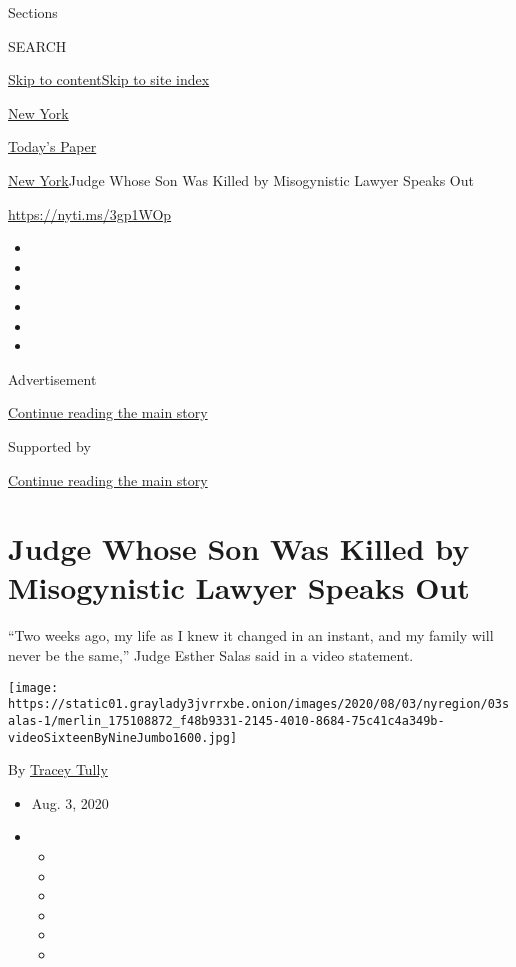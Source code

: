 Sections

SEARCH

\protect\hyperlink{site-content}{Skip to
content}\protect\hyperlink{site-index}{Skip to site index}

\href{https://www.nytimes3xbfgragh.onion/section/nyregion}{New York}

\href{https://myaccount.nytimes3xbfgragh.onion/auth/login?response_type=cookie\&client_id=vi}{}

\href{https://www.nytimes3xbfgragh.onion/section/todayspaper}{Today's
Paper}

\href{/section/nyregion}{New York}\textbar{}Judge Whose Son Was Killed
by Misogynistic Lawyer Speaks Out

\url{https://nyti.ms/3gp1WOp}

\begin{itemize}
\item
\item
\item
\item
\item
\item
\end{itemize}

Advertisement

\protect\hyperlink{after-top}{Continue reading the main story}

Supported by

\protect\hyperlink{after-sponsor}{Continue reading the main story}

\hypertarget{judge-whose-son-was-killed-by-misogynistic-lawyer-speaks-out}{%
\section{Judge Whose Son Was Killed by Misogynistic Lawyer Speaks
Out}\label{judge-whose-son-was-killed-by-misogynistic-lawyer-speaks-out}}

``Two weeks ago, my life as I knew it changed in an instant, and my
family will never be the same,'' Judge Esther Salas said in a video
statement.

\texttt{[image: https://static01.graylady3jvrrxbe.onion/images/2020/08/03/nyregion/03salas-1/merlin\_175108872\_f48b9331-2145-4010-8684-75c41c4a349b-videoSixteenByNineJumbo1600.jpg]}

By \href{https://www.nytimes3xbfgragh.onion/by/tracey-tully}{Tracey
Tully}

\begin{itemize}
\item
  Aug. 3, 2020
\item
  \begin{itemize}
  \item
  \item
  \item
  \item
  \item
  \item
  \end{itemize}
\end{itemize}

